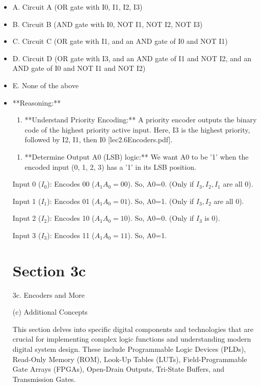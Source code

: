 \documentclass{article}
\begin{document}
\begin{itemize}
    \item A. Circuit A (OR gate with I0, I1, I2, I3)

    \item B. Circuit B (AND gate with I0, NOT I1, NOT I2, NOT I3)

    \item C. Circuit C (OR gate with I1, and an AND gate of I0 and NOT I1)

    \item D. Circuit D (OR gate with I3, and an AND gate of I1 and NOT I2, and an AND gate of I0 and NOT I1 and NOT I2)

    \item E. None of the above

\item **Reasoning:**

    \begin{enumerate}
\item **Understand Priority Encoding:** A priority encoder outputs the binary code of the highest priority active input. Here, I3 is the highest priority, followed by I2, I1, then I0 [lec2.6Encoders.pdf].

\end{enumerate}
    \begin{enumerate}
\item **Determine Output A0 (LSB) logic:** We want A0 to be '1' when the encoded input (0, 1, 2, 3) has a '1' in its LSB position.

\end{enumerate}
         Input 0 ($I_0$): Encodes 00 ($A_1A_0=00$). So, A0=0. (Only if $I_3, I_2, I_1$ are all 0).

         Input 1 ($I_1$): Encodes 01 ($A_1A_0=01$). So, A0=1. (Only if $I_3, I_2$ are all 0).

         Input 2 ($I_2$): Encodes 10 ($A_1A_0=10$). So, A0=0. (Only if $I_3$ is 0).

         Input 3 ($I_3$): Encodes 11 ($A_1A_0=11$). So, A0=1.

\section{Section 3c}

3c. Encoders and More

(c) Additional Concepts

This section delves into specific digital components and technologies that are crucial for implementing complex logic functions and understanding modern digital system design. These include Programmable Logic Devices (PLDs), Read-Only Memory (ROM), Look-Up Tables (LUTs), Field-Programmable Gate Arrays (FPGAs), Open-Drain Outputs, Tri-State Buffers, and Transmission Gates.


\end{itemize}
\end{document}
